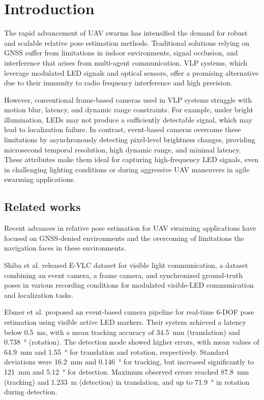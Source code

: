 
\chapter{Introduction\label{chap:introduction}}

The rapid advancement of \ac{UAV} swarms has intensified the demand for robust and scalable relative pose estimation methods.
Traditional solutions relying on \ac{GNSS} suffer from limitations in indoor environments, signal occlusion, and interference that arises from
multi-agent communication.
\ac{VLP} systems, which leverage modulated \ac{LED} signals and optical sensors, offer a promising alternative due to their immunity to radio
frequency interference and high precision.

However, conventional frame-based cameras used in \ac{VLP} systems struggle with motion blur, latency,
and dynamic range constraints. For example, under bright illumination, \ac{LED}s may not produce a sufficiently detectable signal,
which may lead to localization failure. In contrast, event-based cameras overcome these limitations by asynchronously detecting pixel-level
brightness changes, providing microsecond temporal resolution, high dynamic range, and minimal latency. These attributes make them ideal for
capturing high-frequency LED signals, even in challenging lighting conditions or during aggressive \ac{UAV} maneuvers in agile swarming applications.


\section{Related works}
Recent advances in relative pose estimation for UAV swarming applications
have focused on GNSS-denied environments and the overcoming of limitations
the navigation faces in these environments.

Shiba et al. \cite{Shiba25cvprw} released E-VLC dataset for visible light communication, a dataset combining an event camera, a frame camera, and synchronized ground-truth poses in various recording conditions for modulated visible-\ac{LED} communication and localization tasks.

Ebmer et al. \cite{ebmer2023} proposed an event-based camera pipeline for real-time 6-\ac{DOF} pose estimation using visible active LED markers. Their system achieved a latency below \SI{0.5}{\milli\second}, with a mean tracking accuracy of \SI{34.5}{\milli\meter} (translation) and \SI{0.738}{\degree} (rotation). The detection mode showed higher errors, with mean values of \SI{64.9}{\milli\meter} and \SI{1.55}{\degree} for translation and rotation, respectively. Standard deviations were \SI{16.2}{\milli\meter} and \SI{0.146}{\degree} for tracking, but increased significantly to \SI{121}{\milli\meter} and \SI{5.12}{\degree} for detection. Maximum observed errors reached \SI{87.8}{\milli\meter} (tracking) and \SI{1.233}{\meter} (detection) in translation, and up to \SI{71.9}{\degree} in rotation during detection.


